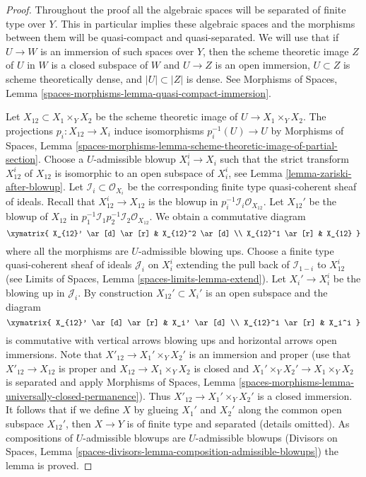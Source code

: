 \begin{proof}
Throughout the proof all the algebraic spaces will be separated of finite
type over $Y$. This in particular implies these algebraic spaces and
the morphisms between them will be quasi-compact and quasi-separated.
We will use that if $U \to W$ is an immersion of such spaces over $Y$,
then the scheme theoretic image $Z$ of $U$ in $W$ is a closed subspace
of $W$ and $U \to Z$ is an open immersion, $U \subset Z$ is scheme
theoretically dense, and $|U| \subset |Z|$ is dense. See
Morphisms of Spaces, Lemma
\ref{spaces-morphisms-lemma-quasi-compact-immersion}.

\medskip\noindent
Let $X_{12} \subset X_1 \times_Y X_2$ be the scheme theoretic image
of $U \to X_1 \times_Y X_2$. The projections $p_i : X_{12} \to X_i$
induce isomorphisms $p_i^{-1}(U) \to U$ by
Morphisms of Spaces, Lemma
\ref{spaces-morphisms-lemma-scheme-theoretic-image-of-partial-section}.
Choose a $U$-admissible blowup $X_i^i \to X_i$ such that
the strict transform $X_{12}^i$ of $X_{12}$ is isomorphic to an
open subspace of $X_i^i$, see
Lemma \ref{lemma-zariski-after-blowup}.
Let $\mathcal{I}_i \subset \mathcal{O}_{X_i}$ be the corresponding
finite type quasi-coherent sheaf of ideals.
Recall that $X_{12}^i \to X_{12}$ is the blowup in
$p_i^{-1}\mathcal{I}_i \mathcal{O}_{X_{12}}$.
Let $X_{12}'$ be the blowup of $X_{12}$ in
$p_1^{-1}\mathcal{I}_1 p_2^{-1}\mathcal{I}_2 \mathcal{O}_{X_{12}}$.
We obtain a commutative diagram
$$
\xymatrix{
X_{12}' \ar[d] \ar[r] & X_{12}^2 \ar[d] \\
X_{12}^1 \ar[r] & X_{12}
}
$$
where all the morphisms are $U$-admissible blowing ups.
Choose a finite type quasi-coherent sheaf of ideals
$\mathcal{J}_i$ on $X_i^i$ extending the pull back
of $\mathcal{I}_{1 - i}$ to $X_{12}^i$ (see
Limits of Spaces, Lemma \ref{spaces-limits-lemma-extend}).
Let $X_i' \to X_i^i$ be the blowing up in $\mathcal{J}_i$.
By construction $X_{12}' \subset X_i'$ is an open subspace and the diagram
$$
\xymatrix{
X_{12}' \ar[d] \ar[r] & X_i' \ar[d] \\
X_{12}^i \ar[r] & X_i^i
}
$$
is commutative with vertical arrows blowing ups and horizontal arrows
open immersions. Note that $X'_{12} \to X_1' \times_Y X_2'$ is
an immersion and proper (use that $X'_{12} \to X_{12}$ is proper
and $X_{12} \to X_1 \times_Y X_2$ is closed and $X_1' \times_Y X_2' \to
X_1 \times_Y X_2$ is separated and apply Morphisms of Spaces, Lemma
\ref{spaces-morphisms-lemma-universally-closed-permanence}).
Thus $X'_{12} \to  X_1' \times_Y X_2'$ is a closed immersion.
It follows that if we define $X$ by glueing $X_1'$ and $X_2'$
along the common open subspace $X_{12}'$, then $X \to Y$ is of finite type
and separated (details omitted). As compositions of $U$-admissible blowups
are $U$-admissible blowups
(Divisors on Spaces, Lemma
\ref{spaces-divisors-lemma-composition-admissible-blowups})
the lemma is proved.
\end{proof}

